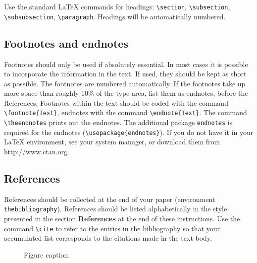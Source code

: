 \documentclass{iosart2c}
\begin{document}
Use the standard \LaTeX{} commands for headings: \verb|\section|, \verb|\subsection|, \verb|\subsubsection|, \verb|\paragraph|.
Headings will be automatically numbered.

\subsection{Footnotes and endnotes}
Footnotes should only be used if absolutely essential.
In most cases it is possible to incorporate the information in the text.
If used, they should be kept as short as possible.
The footnotes are numbered automatically. If the footnotes take up more space than roughly 10\% of the type area,
list them as endnotes, before the References. Footnotes within the text should be coded with the command
\verb|\footnote{Text}|,
 endnotes with the command \verb|\endnote{Text}|.
The command \verb|\theendnotes| prints out the endnotes.
The additional package \texttt{endnotes} is required for the endnotes (\verb|\usepackage{endnotes}|).
If you do not have it in your \LaTeX{} environment,
see your system manager, or download them from http://www.ctan.org.



\subsection{References}

References should be collected at the end of your paper (environment
\verb|thebibliography|). References should be listed alphabetically in the style presented in the section \textbf{References} at the
end of these instructions. Use the command \verb|\cite| to refer to the entries in the bibliography so that your
accumulated list corresponds to the citations made in the text body.

\begin{figure}[t]
\leavevmode{}
\caption{Figure caption.}
\end{figure}
\end{document}
